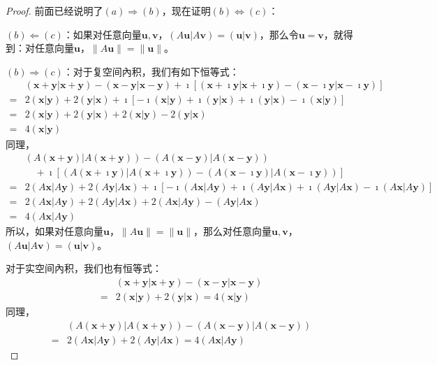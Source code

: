 \documentclass[12pt,UTF8]{ctexbook}
\begin{document}
\begin{proof} %
前面已经说明了$(a) \Rightarrow (b)$，现在证明$(b) \Leftrightarrow (c)$：

$(b) \Leftarrow (c)$：如果对任意向量$\mathbf{u}, \mathbf{v}$，$(A\mathbf{u}|A\mathbf{v}) = (\mathbf{u}|\mathbf{v})$，那么令$\mathbf{u} = \mathbf{v}$，就得到：对任意向量$\mathbf{u}$，$\|A\mathbf{u}\| = \|\mathbf{u}\|$。

$(b) \Rightarrow (c)$：对于复空间內积，我们有如下恒等式：
\begin{align*}
    &(\mathbf{x}+\mathbf{y}|\mathbf{x}+\mathbf{y}) - (\mathbf{x}-\mathbf{y}|\mathbf{x}-\mathbf{y}) + \imath \left[(\mathbf{x}+\imath \mathbf{y}|\mathbf{x}+\imath \mathbf{y}) - (\mathbf{x}-\imath \mathbf{y}|\mathbf{x}-\imath \mathbf{y})\right]  \\
    =& 2(\mathbf{x}|\mathbf{y}) + 2(\mathbf{y}|\mathbf{x}) + \imath \left[-\imath (\mathbf{x}|\mathbf{y}) + \imath (\mathbf{y}|\mathbf{x}) + \imath (\mathbf{y}|\mathbf{x}) -\imath (\mathbf{x}|\mathbf{y}) \right]  \\
    =& 2(\mathbf{x}|\mathbf{y}) + 2(\mathbf{y}|\mathbf{x}) + 2(\mathbf{x}|\mathbf{y}) - 2(\mathbf{y}|\mathbf{x})  \\
    =& 4(\mathbf{x}|\mathbf{y}) 
\end{align*}
同理，
\begin{align*}
    &(A(\mathbf{x}+\mathbf{y})|A(\mathbf{x}+\mathbf{y})) - (A(\mathbf{x}-\mathbf{y})|A(\mathbf{x}-\mathbf{y}))  \\
    &\quad + \imath \left[(A(\mathbf{x}+\imath \mathbf{y})|A(\mathbf{x}+\imath \mathbf{y})) - (A(\mathbf{x}-\imath \mathbf{y})|A(\mathbf{x}-\imath \mathbf{y}))\right]  \\
    =& 2(A\mathbf{x}|A\mathbf{y}) + 2(A\mathbf{y}|A\mathbf{x}) + \imath \left[-\imath (A\mathbf{x}|A\mathbf{y}) + \imath (A\mathbf{y}|A\mathbf{x}) + \imath (A\mathbf{y}|A\mathbf{x}) -\imath (A\mathbf{x}|A\mathbf{y}) \right]  \\
    =& 2(A\mathbf{x}|A\mathbf{y}) + 2(A\mathbf{y}|A\mathbf{x}) + 2(A\mathbf{x}|A\mathbf{y}) - (A\mathbf{y}|A\mathbf{x})  \\
    =& 4(A\mathbf{x}|A\mathbf{y}) 
\end{align*}
所以，如果对任意向量$\mathbf{u}$，$\|A\mathbf{u}\| = \|\mathbf{u}\|$，那么对任意向量$\mathbf{u}, \mathbf{v}$，$(A\mathbf{u}|A\mathbf{v}) = (\mathbf{u}|\mathbf{v})$。

对于实空间內积，我们也有恒等式：
\begin{align*}
    &(\mathbf{x}+\mathbf{y}|\mathbf{x}+\mathbf{y}) - (\mathbf{x}-\mathbf{y}|\mathbf{x}-\mathbf{y})  \\
    =& 2(\mathbf{x}|\mathbf{y}) + 2(\mathbf{y}|\mathbf{x}) = 4(\mathbf{x}|\mathbf{y}) 
\end{align*}
同理，
\begin{align*}
    &(A(\mathbf{x}+\mathbf{y})|A(\mathbf{x}+\mathbf{y})) - (A(\mathbf{x}-\mathbf{y})|A(\mathbf{x}-\mathbf{y}))  \\
    =& 2(A\mathbf{x}|A\mathbf{y}) + 2(A\mathbf{y}|A\mathbf{x}) = 4(A\mathbf{x}|A\mathbf{y}) 
\end{align*}


\end{proof}
\end{document}
